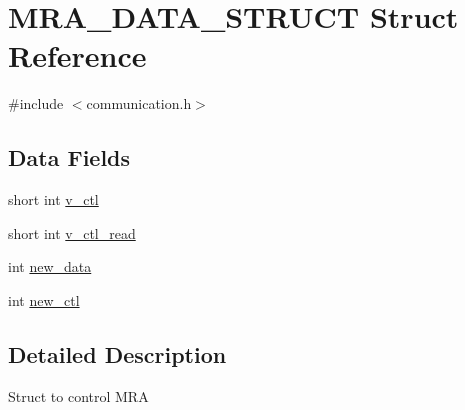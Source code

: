 \hypertarget{structMRA__DATA__STRUCT}{
\section{MRA\_\-DATA\_\-STRUCT Struct Reference}
\label{structMRA__DATA__STRUCT}
}


{\ttfamily \#include $<$communication.h$>$}

\subsection*{Data Fields}
\begin{DoxyCompactItemize}
\item 
short int \hyperlink{structMRA__DATA__STRUCT_a64b4e6bb604e58de593a60c87942b966}{v\_\-ctl}
\item 
short int \hyperlink{structMRA__DATA__STRUCT_a3a31d57268c33b21ac915fdc27dfe474}{v\_\-ctl\_\-read}
\item 
int \hyperlink{structMRA__DATA__STRUCT_afca6e851d302f3a786885a4e1eec79d7}{new\_\-data}
\item 
int \hyperlink{structMRA__DATA__STRUCT_a5b1af89ee717f5b14c18e8ac12e93e75}{new\_\-ctl}
\end{DoxyCompactItemize}


\subsection{Detailed Description}
Struct to control MRA 

